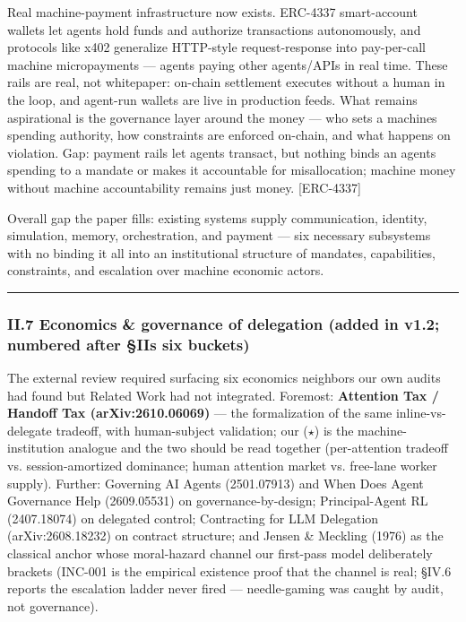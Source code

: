 \documentclass[
]{article}
\begin{document}
Real machine-payment infrastructure now exists. ERC-4337 smart-account
wallets let agents hold funds and authorize transactions autonomously,
and protocols like x402 generalize HTTP-style request-response into
pay-per-call machine micropayments --- agents paying other agents/APIs
in real time. These rails are real, not whitepaper: on-chain settlement
executes without a human in the loop, and agent-run wallets are live in
production feeds. What remains aspirational is the governance layer
around the money --- who sets a machine\textquotesingle s spending
authority, how constraints are enforced on-chain, and what happens on
violation. Gap: payment rails let agents transact, but nothing binds an
agent\textquotesingle s spending to a mandate or makes it accountable
for misallocation; machine money without machine accountability remains
just money. {[}ERC-4337{]}

Overall gap the paper fills: existing systems supply communication,
identity, simulation, memory, orchestration, and payment --- six
necessary subsystems with no binding it all into an institutional
structure of mandates, capabilities, constraints, and escalation over
machine economic actors.

\begin{center}\rule{0.5\linewidth}{0.5pt}\end{center}

\subsubsection{II.7 Economics \& governance of delegation (added in
v1.2; numbered after \S{}II\textquotesingle s six
buckets)}\label{ii7-economics--governance-of-delegation-added-in-v12-numbered-after-iis-six-buckets}

The external review required surfacing six economics neighbors our own
audits had found but Related Work had not integrated. Foremost:
\textbf{Attention Tax / Handoff Tax (arXiv:2610.06069)} --- the
formalization of the same inline-vs-delegate tradeoff, with
human-subject validation; our ($\star$) is the machine-institution analogue
and the two should be read together (per-attention tradeoff vs.
session-amortized dominance; human attention market vs. free-lane worker
supply). Further: Governing AI Agents (2501.07913) and When Does Agent
Governance Help (2609.05531) on governance-by-design; Principal-Agent RL
(2407.18074) on delegated control; Contracting for LLM Delegation
(arXiv:2608.18232) on contract structure; and Jensen \& Meckling (1976)
as the classical anchor whose moral-hazard channel our first-pass model
deliberately brackets (INC-001 is the empirical existence proof that the
channel is real; \S{}IV.6 reports the escalation ladder never fired ---
needle-gaming was caught by audit, not governance).
\end{document}
